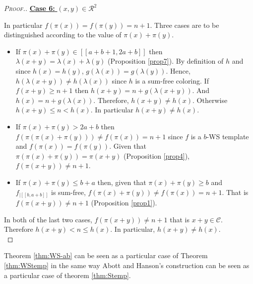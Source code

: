 \begin{proof}[\textsc{Proof.}]
\noindent \underline{\textbf{Case 6:} \((x,y) \in \mathcal{R}^2\)}
\par
In particular \(f(\pi(x)) = f(\pi(y))=n + 1\). Three cases are to be distinguished according to the value of \(\pi(x) + \pi(y)\).
\begin{itemize}
\item If \(\pi(x) + \pi(y) \in [\![a + b + 1, 2 a + b]\!]\) then \(\lambda(x + y) = \lambda(x) + \lambda(y)\)
	(Proposition \ref{prop7}). By definition of \(h\) and since \(h(x) = h(y)\), \(g(\lambda(x)) = g(\lambda(y))\).
	Hence, \(h(\lambda(x + y)) \neq h(\lambda(x))\) since \(h\) is a sum-free coloring. If \(f(x+y) \geqslant n + 1\)
	then \(h(x + y) = n + g(\lambda(x + y))\). And \(h(x) = n + g(\lambda(x))\). Therefore, \(h(x + y)  \neq h(x)\).
	Otherwise \(h(x+y) \leqslant n < h(x)\). In particular \(h(x + y) \neq h(x)\).
\item If \(\pi(x)+\pi(y)>2a+b\) then \(f(\pi(\pi(x)+\pi(y))) \neq f(\pi(x)) = n + 1\) since \(f\) is a \(b\)-WS template and
	\(f(\pi(x)) = f(\pi(y))\). Given that \(\pi(\pi(x)+\pi(y)) = \pi(x+y)\) (Proposition \ref{prop4}), \(f(\pi(x+y)) \neq n + 1\).
\item \begin{sloppypar}
	If \(\pi(x)+\pi(y)\leqslant b+a\) then, given that \(\pi(x)+\pi(y) \geqslant b\) and \(f_{| [\![b, a + b ]\!]}\) is
	sum-free, \({f(\pi(x) + \pi(y)) \neq f(\pi(x)) = n + 1}\). That is \({f(\pi(x + y)) \neq n + 1}\) (Proposition \ref{prop1}).
	\end{sloppypar}
\end{itemize}
\par
In both of the last two cases, \({f(\pi(x + y)) \neq n + 1}\) that is \(x+y \in \mathcal{C}\). Therefore \(h(x+y) < n \leqslant h(x)\).
In particular, \(h(x + y) \neq h(x)\). \\
\end{proof}

Theorem \ref{thm:WS-ab} can be seen as a particular case of Theorem \ref{thm:WStemp} in the same way Abott and Hanson's 
construction \cite{AbbottHanson} can be seen as a particular case of theorem \ref{thm:Stemp}.

